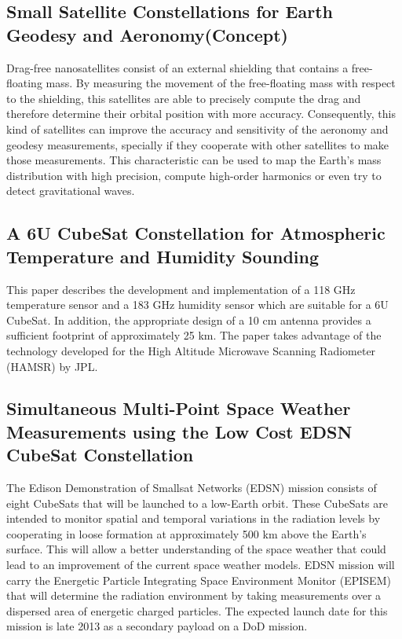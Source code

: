 \subsection{Small Satellite Constellations for Earth Geodesy and Aeronomy(Concept)}

Drag-free nanosatellites consist of an external shielding that contains a free-floating mass. By measuring the movement of the free-floating mass with respect to the shielding, this satellites are able to precisely compute the drag and therefore determine their orbital position with more accuracy. Consequently, this kind of satellites can  improve the accuracy and sensitivity of the aeronomy and geodesy measurements, specially if they cooperate with other satellites to make those measurements. This characteristic can be used to map the Earth's mass distribution
with high precision, compute high-order harmonics or even try to detect gravitational waves.\cite{Conklin_GeoAero_Constellation}

\subsection{A 6U CubeSat Constellation for Atmospheric Temperature and Humidity Sounding}

This paper describes the development and implementation of a 118 GHz temperature sensor and a 183 GHz humidity sensor which are suitable for a 6U CubeSat. In addition, the appropriate design of a 10 cm antenna provides a sufficient footprint of approximately 25 km. The paper takes advantage of the technology developed for the High Altitude Microwave Scanning Radiometer (HAMSR) by JPL. \cite{Sharmila_ContellationTempHumidity}

\subsection{Simultaneous Multi-Point Space Weather Measurements using the Low Cost EDSN CubeSat Constellation}

The Edison Demonstration of Smallsat Networks (EDSN) mission consists of eight CubeSats that will be launched to a low-Earth orbit. These CubeSats are intended to monitor spatial and temporal variations in the radiation levels by cooperating in loose formation at approximately 500 km above the Earth's surface. This will allow a better understanding of the space weather that could lead to an improvement of the current space weather models. EDSN mission will carry the Energetic Particle Integrating Space Environment Monitor (EPISEM) that will determine the radiation environment by taking measurements over a dispersed area of energetic charged particles. The expected launch date for this mission is late 2013 as a secondary payload on a DoD mission.\cite{Gunderson_MultiptMeasureConstellation}\cite{Yost_MultipointMeasurement}

